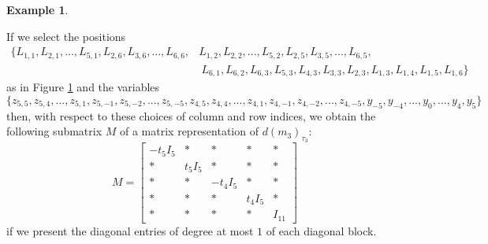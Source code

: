 \documentclass[reqno]{amsart}
\theoremstyle{definition}
\newtheorem{example}[theorem]{Example}
\numberwithin{equation}{section}
\begin{document}
\begin{example}
\begin{figure}[t!]
    \label{fig:picking Lij 2}
    \end{figure}
    If we select the positions
    \begin{equation}\label{eq:picking Lij 2}
    \begin{aligned}
        \{L_{1,1},L_{2,1},...,L_{5,1},L_{2,6},L_{3,6},...,L_{6,6},&L_{1,2},L_{2,2},...,L_{5,2},L_{2,5},L_{3,5},...,L_{6,5},\\
        &~L_{6,1},L_{6,2},L_{6,3},L_{5,3},L_{4,3},L_{3,3},L_{2,3},L_{1,3},L_{1,4},L_{1,5},L_{1,6}\}
    \end{aligned}
    \end{equation}
    as in Figure \ref{fig:picking Lij 2} and the variables
    \begin{equation*}
        \{z_{5,5},z_{5,4},...,z_{5,1},z_{5,-1},z_{5,-2},...,z_{5,-5},z_{4,5},z_{4,4},...,z_{4,1},z_{4,-1},z_{4,-2},...,z_{4,-5},y_{-5},y_{-4},...,y_0,...,y_4,y_5\}
    \end{equation*}
    then, with respect to these choices of column and row indices, we obtain the following submatrix $M$ of a matrix representation of $d(m_3)_{\tau_3}$:
    \begin{equation*}
        M=\begin{bmatrix}
            -t_5I_5  & * &* & * & *\\
            * & t_5I_5 & * & * & *\\
            * & * & -t_4I_5 & * & *\\
            * & * & * & t_4I_5 & *\\
            * & * & * & * & I_{11}
        \end{bmatrix}
    \end{equation*}
    if we present the diagonal entries of degree at most $1$ of each diagonal block. 
    

\end{example}
\end{document}
